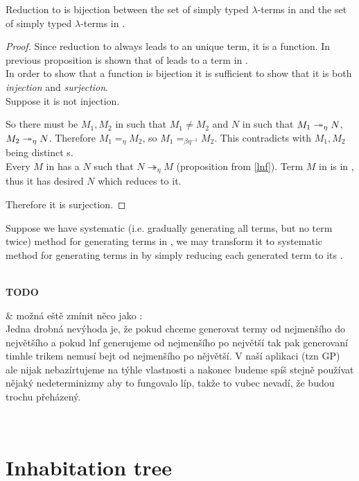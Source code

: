 \documentclass[12pt,a4paper]{report}
\newcommand{\lterms}{$\lambda$-terms\xspace}
\newenvironment{todo}
{ ~\\[0.5em]
  {\color{red}\textbf{TODO}}
  \begin{easylist}[itemize]}
{ \end{easylist}
  ~}
\begin{document}
\begin{proposition}

Reduction to \enf is bijection between  
the set of simply typed \lterms in \lnf and 
the set of simply typed \lterms in \benf.
\end{proposition}
\begin{proof}

Since reduction to \enf always leads to an unique term, it is a function.
In previous proposition is shown that \ered of \lnf
leads to a term in \benf.\\

In order to show that a function is bijection it is sufficient to show that it is
both \textit{injection} and \textit{surjection}.\\

Suppose it is not injection.

So there must be $M_1,M_2$ in \lnf such that $M_1 \not= M_2$
and $N$ in \benf such that $M_1 \twoheadrightarrow_\eta N$, $M_2 \twoheadrightarrow_\eta N$.
Therefore $M_1 =_\eta M_2$, 
so $M_1 =_{\beta\eta^{-1}} M_2$.
This contradicts with $M_1,M_2$ being distinct \lnf{}s.\\

Every $M$ in \bnf has a \lnf $N$ such that 
$N \twoheadrightarrow_{\eta} M$ (proposition from \ref{lnf}).
Term $M$ in \benf is in \bnf, thus it has desired \lnf $N$
which reduces to it. 

Therefore it is surjection. 
\end{proof}

Suppose we have systematic (i.e. gradually generating all terms, 
but no term twice) method for generating terms in \lnf,
we may transform it to systematic method for generating terms in \benf
by simply reducing each generated term to its \enf.  


\begin{todo}
& možná eště zmínit něco jako : \\
Jedna drobná nevýhoda je, že pokud chceme generovat termy od nejmenšího do největšího
a pokud lnf generujeme od nejmenšího po největší tak pak generovaní \benf
timhle trikem nemusí bejt od nejmenšího po nějvětší. V naší aplikaci (tzn GP)
ale nijak nebazírtujeme na týhle vlastnosti a nakonec budeme spíš stejně používat
nějaký nedeterminizmy aby to fungovalo líp, takže to vubec nevadí, že budou trochu přeházený. 
\end{todo}
   


\newpage
\section{Inhabitation tree}
\end{document}
